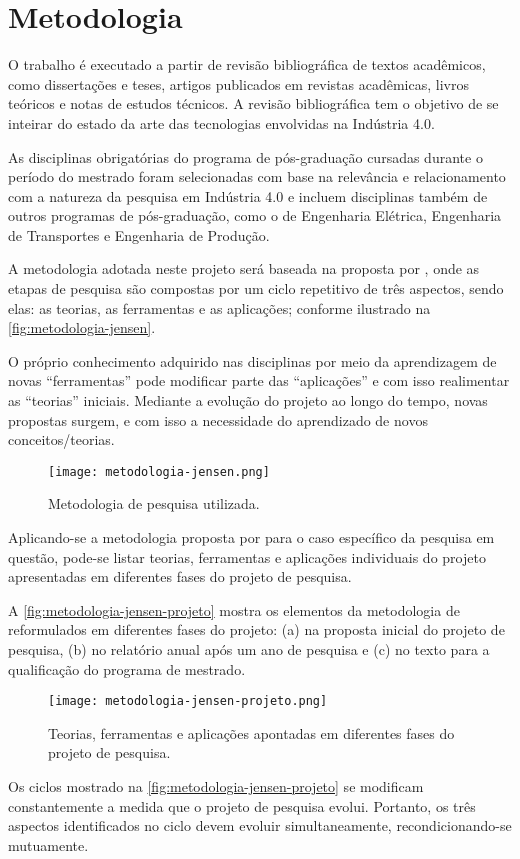 \chapter{Metodologia}
\label{cha:metodologia}

	O trabalho é executado a partir de revisão bibliográfica de textos acadêmicos, como dissertações e teses, artigos publicados em revistas acadêmicas, livros teóricos e notas de estudos técnicos. A revisão bibliográfica tem o objetivo de se inteirar do estado da arte das tecnologias envolvidas na Indústria 4.0.
	
	As disciplinas obrigatórias do programa de pós-graduação cursadas durante o período do mestrado foram selecionadas com base na relevância e relacionamento com a natureza da pesquisa em Indústria 4.0 e incluem disciplinas também de outros programas de pós-graduação, como o de Engenharia Elétrica, Engenharia de Transportes e Engenharia de Produção.
	
	A metodologia adotada neste projeto será baseada na proposta por , onde as etapas de pesquisa são compostas por um ciclo repetitivo de três aspectos, sendo elas: as teorias, as ferramentas e as aplicações; conforme ilustrado na \autoref{fig:metodologia-jensen}.
	
	O próprio conhecimento adquirido nas disciplinas por meio da aprendizagem de novas “ferramentas” pode modificar parte das “aplicações” e com isso realimentar as “teorias” iniciais. Mediante a evolução do projeto ao longo do tempo, novas propostas surgem, e com isso a necessidade do aprendizado de novos conceitos/teorias.

	\begin{figure}[htb]
		\centering
		\caption{Metodologia de pesquisa utilizada.}
		\label{fig:metodologia-jensen}
		\texttt{[image: metodologia-jensen.png]}
	\end{figure}

	Aplicando-se a metodologia proposta por  para o caso específico da pesquisa em questão, pode-se listar teorias, ferramentas e aplicações individuais do projeto apresentadas em diferentes fases do projeto de pesquisa.
	
	A \autoref{fig:metodologia-jensen-projeto} mostra os elementos da metodologia de  reformulados em diferentes fases do projeto: (a) na proposta inicial do projeto de pesquisa, (b) no relatório anual após um ano de pesquisa e (c) no texto para a qualificação do programa de mestrado.
	
	\begin{figure}[htb]
		\centering
		\caption{Teorias, ferramentas e aplicações apontadas em diferentes fases do projeto de pesquisa.}
		\label{fig:metodologia-jensen-projeto}
		\texttt{[image: metodologia-jensen-projeto.png]}
	\end{figure}
	
	
	 Os ciclos mostrado na \autoref{fig:metodologia-jensen-projeto} se modificam constantemente a medida que o projeto de pesquisa evolui. Portanto, os três aspectos identificados no ciclo devem evoluir simultaneamente, recondicionando-se mutuamente.

